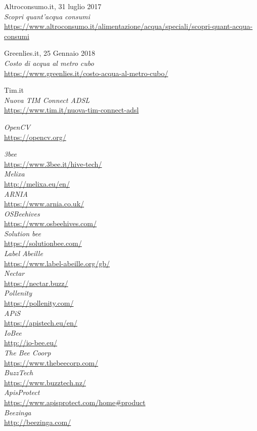 \begin{thebibliography}{99}
Altroconsumo.it, 31 luglio 2017 \\
\emph{Scopri quant'acqua consumi}\\
\url{https://www.altroconsumo.it/alimentazione/acqua/speciali/scopri-quant-acqua-consumi}

Greenlies.it, 25 Gennaio 2018 \\
\emph{Costo di acqua al metro cubo} \\
\url{https://www.greenlies.it/costo-acqua-al-metro-cubo/}

Tim.it \\
\emph{Nuova TIM Connect ADSL} \\
\url{https://www.tim.it/nuova-tim-connect-adsl}

\emph{OpenCV} \\
\url{https://opencv.org/}

\emph{3bee}          \\ \url{https://www.3bee.it/hive-tech/} \\
\emph{Melixa}        \\ \url{http://melixa.eu/en/}  \\
\emph{ARNIA}         \\ \url{https://www.arnia.co.uk/} \\
\emph{OSBeehives}    \\ \url{https://www.osbeehives.com/} \\
\emph{Solution bee}  \\ \url{https://solutionbee.com/}  \\
\emph{Label Abeille} \\ \url{https://www.label-abeille.org/gb/}  \\
\emph{Nectar}        \\ \url{https://nectar.buzz/}   \\
\emph{Pollenity}     \\ \url{https://pollenity.com/} \\
\emph{APiS}          \\ \url{https://apistech.eu/en/} \\
\emph{IoBee}         \\ \url{http://io-bee.eu/} \\
\emph{The Bee Coorp} \\ \url{https://www.thebeecorp.com/} \\
\emph{BuzzTech}      \\ \url{https://www.buzztech.nz/} \\
\emph{ApisProtect}   \\ \url{https://www.apisprotect.com/home#product} \\
\emph{Beezinga}      \\ \url{http://beezinga.com/} \\


\end{thebibliography}

